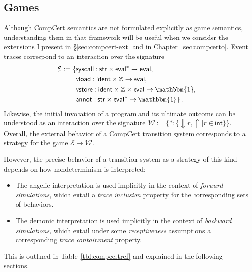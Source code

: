 \documentclass[11pt,oneside]{book}
\theoremstyle{definition}
\newcommand{\kw}[1]{\ensuremath{ \mathsf{#1} }}
\begin{document}

\subsection{Games} \label{sec:sem:games} %

Although CompCert semantics
are not formulated explicitly as game semantics,
understanding them in that framework
will be useful
when we consider the extensions I present in \S\ref{sec:compcert-ext}
and in Chapter~\ref{sec:compcerto}.
Event traces correspond to an interaction
over the signature
\begin{align*}
  \mathcal{E} := \{ {}
    &\kw{syscall} :
      \kw{str} \times \kw{eval}^* \rightarrow \kw{eval},
      \\
    &\kw{vload} :
      \kw{ident} \times \mathbb{Z} \rightarrow \kw{eval},
      \\
    &\kw{vstore} :
      \kw{ident} \times \mathbb{Z} \times \kw{eval} \rightarrow \mathbbm{1},
      \\
    &\kw{annot} :
      \kw{str} \times \kw{eval}^* \rightarrow \mathbbm{1}
  \}
  \,.
\end{align*}
Likewise,
the initial invocation of a program
and its ultimate outcome can
be understood as an interaction over the signature
$
  \mathcal{W} := \{
    {*} : \{ {\Downarrow} r, {\Uparrow} \mid r \in \kw{int} \}
  \}
$.
Overall,
the external behavior of
a CompCert transition system
corresponds to a strategy
for the game $\mathcal{E} \rightarrow \mathcal{W}$.

However,
the precise behavior of a transition system
as a strategy of this kind
depends on how nondeterminism is interpreted:
\begin{itemize}
  \item
    The angelic interpretation
    is used implicitly in the context of
    \emph{forward simulations},
    which entail a \emph{trace inclusion} property
    for the corresponding sets of behaviors.
  \item
    The demonic interpretation
    is used implicitly in the context of
    \emph{backward simulations},
    which entail
    under some \emph{receptiveness} assumptions
    a corresponding \emph{trace containment} property.
\end{itemize}
This is outlined in Table~\ref{tbl:compcertref}
and explained in the following sections.
\end{document}
